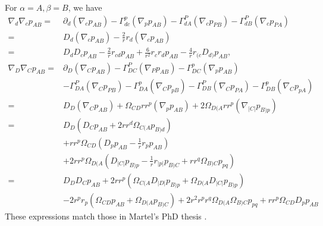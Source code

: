 \documentclass[12pt]{report}
\begin{document}
For $\alpha=A,\beta=B$, we have
\begin{subequations}
\label{eq:scd_der_metric_pert_AB}
\begin{align}
    \nabla_d\nabla_cp_{AB}
    =&
    \partial_d\left(\nabla_cp_{AB}\right)
    -
    \Gamma^p_{dc}\left(\nabla_pp_{AB}\right)
    -
    \Gamma^P_{dA}\left(\nabla_cp_{PB}\right)
    -
    \Gamma^P_{dB}\left(\nabla_cp_{PA}\right)
    \nonumber\\
    =&
    D_d\left(\nabla_cp_{AB}\right)
    -
    \frac{2}{r}r_d\left(\nabla_cp_{AB}\right)
    \nonumber\\
    =&
    D_dD_cp_{AB} 
    -
    \frac{2}{r}r_{cd}p_{AB}
    +
    \frac{6}{r^2}r_cr_dp_{AB}
    -
    \frac{4}{r}r_{(c}D_{d)}p_{AB}
    ,\\
    \nabla_D\nabla_Cp_{AB}
    =&
    \partial_D\left(\nabla_Cp_{AB}\right)
    -
    \Gamma_{DC}^P\left(\nabla_Pp_{AB}\right)
    -
    \Gamma_{DC}^p\left(\nabla_pp_{AB}\right)
    \nonumber\\
    &
    -
    \Gamma_{DA}^P\left(\nabla_Cp_{PB}\right)
    -
    \Gamma_{DA}^p\left(\nabla_Cp_{pB}\right)
    -
    \Gamma_{DB}^P\left(\nabla_Cp_{PA}\right)
    -
    \Gamma_{DB}^p\left(\nabla_Cp_{pA}\right)
    \nonumber\\
    =&
    D_D\left(\nabla_Cp_{AB}\right)
    +
    \Omega_{CD}rr^p\left(\nabla_pp_{AB}\right)
    +
    2\Omega_{D(A}rr^p\left(\nabla_{|C|}p_{B)p}\right)
    \nonumber\\
    =&
    D_D\left(D_Cp_{AB} + 2rr^d\Omega_{C(A}p_{B)d}\right)
    \nonumber\\
    &
    +
    rr^p\Omega_{CD}\left(
        D_pp_{AB}
        -
        \frac{1}{r}r_pp_{AB}
    \right)
    \nonumber\\
    &
    +
    2rr^p\Omega_{D(A}\left(
        D_{|C|}p_{B)p}
        -
        \frac{1}{r}r_{|p|}p_{B)C}
        +
        rr^q\Omega_{B)C}p_{pq}
    \right)
    \nonumber\\
    =&
    D_DD_Cp_{AB}
    +
    2rr^p\left(
        \Omega_{C(A}D_{|D|}p_{B)p}
        +
        \Omega_{D(A}D_{|C|}p_{B)p}
    \right)
    \nonumber\\
    &
    -
    2r^pr_p\left(
        \Omega_{CD}p_{AB}
        +
        \Omega_{D(A}p_{B)C}
    \right)
    +
    2r^2r^pr^q\Omega_{D(A}\Omega_{B)C}p_{pq}
    +
    rr^p\Omega_{CD}D_pp_{AB}
\end{align}
\end{subequations}
These expressions match those in Martel's PhD thesis \cite{Martel:2003ab}.
\end{document}

